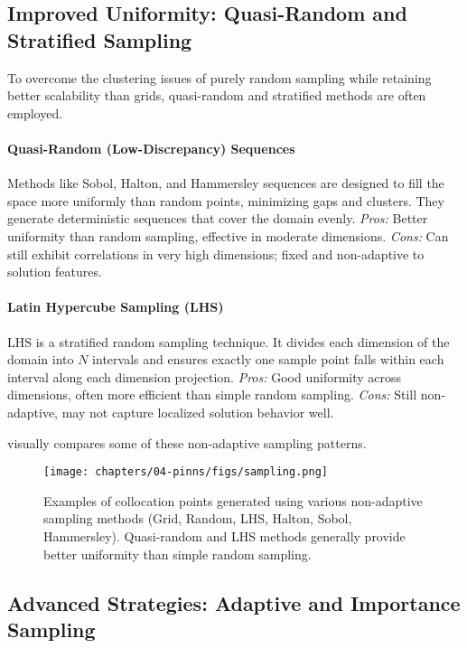 \subsection{Improved Uniformity: Quasi-Random and Stratified Sampling}

To overcome the clustering issues of purely random sampling while retaining better scalability than grids, quasi-random and stratified methods are often employed.

\paragraph{Quasi-Random (Low-Discrepancy) Sequences} Methods like Sobol, Halton, and Hammersley sequences are designed to fill the space more uniformly than random points, minimizing gaps and clusters. They generate deterministic sequences that cover the domain evenly.
\textit{Pros:} Better uniformity than random sampling, effective in moderate dimensions. \textit{Cons:} Can still exhibit correlations in very high dimensions; fixed and non-adaptive to solution features.

\paragraph{Latin Hypercube Sampling (LHS)} LHS is a stratified random sampling technique. It divides each dimension of the domain into $N$ intervals and ensures exactly one sample point falls within each interval along each dimension projection.
\textit{Pros:} Good uniformity across dimensions, often more efficient than simple random sampling. \textit{Cons:} Still non-adaptive, may not capture localized solution behavior well.

 visually compares some of these non-adaptive sampling patterns.

\begin{figure}[htbp] %
    \centering
    \texttt{[image: chapters/04-pinns/figs/sampling.png]}
    \caption{Examples of collocation points generated using various non-adaptive sampling methods (Grid, Random, LHS, Halton, Sobol, Hammersley). Quasi-random and LHS methods generally provide better uniformity than simple random sampling.}
    \label{fig:collocation-sampling}
\end{figure}

\subsection{Advanced Strategies: Adaptive and Importance Sampling}

